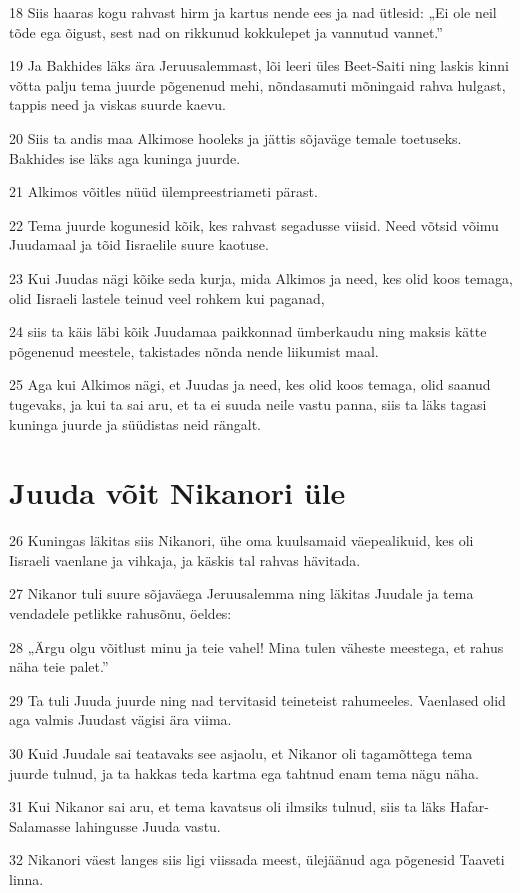 \par 18 Siis haaras kogu rahvast hirm ja kartus nende ees ja nad ütlesid: „Ei ole neil tõde ega õigust, sest nad on rikkunud kokkulepet ja vannutud vannet.”
\par 19 Ja Bakhides läks ära Jeruusalemmast, lõi leeri üles Beet-Saiti ning laskis kinni võtta palju tema juurde põgenenud mehi, nõndasamuti mõningaid rahva hulgast, tappis need ja viskas suurde kaevu.
\par 20 Siis ta andis maa Alkimose hooleks ja jättis sõjaväge temale toetuseks. Bakhides ise läks aga kuninga juurde.
\par 21 Alkimos võitles nüüd ülempreestriameti pärast.
\par 22 Tema juurde kogunesid kõik, kes rahvast segadusse viisid. Need võtsid võimu Juudamaal ja tõid Iisraelile suure kaotuse.
\par 23 Kui Juudas nägi kõike seda kurja, mida Alkimos ja need, kes olid koos temaga, olid Iisraeli lastele teinud veel rohkem kui paganad,
\par 24 siis ta käis läbi kõik Juudamaa paikkonnad ümberkaudu ning maksis kätte põgenenud meestele, takistades nõnda nende liikumist maal.
\par 25 Aga kui Alkimos nägi, et Juudas ja need, kes olid koos temaga, olid saanud tugevaks, ja kui ta sai aru, et ta ei suuda neile vastu panna, siis ta läks tagasi kuninga juurde ja süüdistas neid rängalt. 

\section*{Juuda võit Nikanori üle}

\par 26 Kuningas läkitas siis Nikanori, ühe oma kuulsamaid väepealikuid, kes oli Iisraeli vaenlane ja vihkaja, ja käskis tal rahvas hävitada.
\par 27 Nikanor tuli suure sõjaväega Jeruusalemma ning läkitas Juudale ja tema vendadele petlikke rahusõnu, öeldes:
\par 28 „Ärgu olgu võitlust minu ja teie vahel! Mina tulen väheste meestega, et rahus näha teie palet.”
\par 29 Ta tuli Juuda juurde ning nad tervitasid teineteist rahumeeles. Vaenlased olid aga valmis Juudast vägisi ära viima.
\par 30 Kuid Juudale sai teatavaks see asjaolu, et Nikanor oli tagamõttega tema juurde tulnud, ja ta hakkas teda kartma ega tahtnud enam tema nägu näha.
\par 31 Kui Nikanor sai aru, et tema kavatsus oli ilmsiks tulnud, siis ta läks Hafar-Salamasse lahingusse Juuda vastu.
\par 32 Nikanori väest langes siis ligi viissada meest, ülejäänud aga põgenesid Taaveti linna. 

